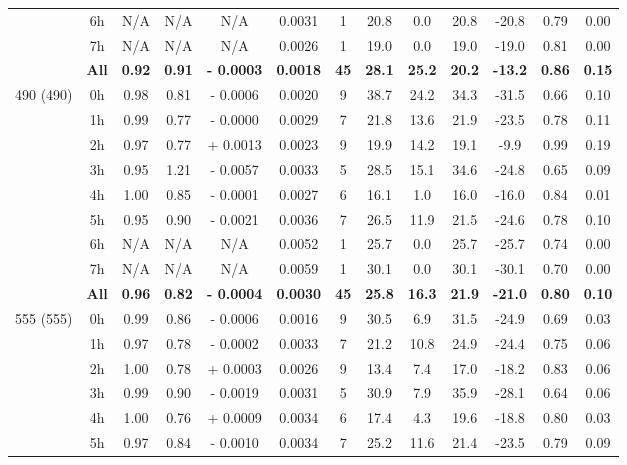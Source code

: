 \documentclass[preview]{standalone}
\begin{document}
\begin{tabular}{ccccccccccccc}
 & 6h  & N/A & N/A & N/A & 0.0031 &  1 & 20.8 & 0.0 & 20.8 & -20.8 & 0.79 & 0.00\\ 
 & 7h  & N/A & N/A & N/A & 0.0026 &  1 & 19.0 & 0.0 & 19.0 & -19.0 & 0.81 & 0.00\\ \cline{2-13}
 & \textbf{All} & \textbf{0.92} & \textbf{0.91} & \textbf{- 0.0003} & \textbf{0.0018} & \textbf{45} & \textbf{28.1} & \textbf{25.2} & \textbf{20.2} & \textbf{-13.2} & \textbf{0.86} & \textbf{0.15} \\ \hline
\multirow{9}{*}{490 (490)} & 0h  & 0.98 & 0.81 & - 0.0006 & 0.0020 &  9 & 38.7 & 24.2 & 34.3 & -31.5 & 0.66 & 0.10 \\ 
 & 1h  & 0.99 & 0.77 & - 0.0000 & 0.0029 &  7 & 21.8 & 13.6 & 21.9 & -23.5 & 0.78 & 0.11 \\ 
 & 2h  & 0.97 & 0.77 & + 0.0013 & 0.0023 &  9 & 19.9 & 14.2 & 19.1 & -9.9 & 0.99 & 0.19 \\ 
 & 3h  & 0.95 & 1.21 & - 0.0057 & 0.0033 &  5 & 28.5 & 15.1 & 34.6 & -24.8 & 0.65 & 0.09 \\ 
 & 4h  & 1.00 & 0.85 & - 0.0001 & 0.0027 &  6 & 16.1 & 1.0 & 16.0 & -16.0 & 0.84 & 0.01 \\ 
 & 5h  & 0.95 & 0.90 & - 0.0021 & 0.0036 &  7 & 26.5 & 11.9 & 21.5 & -24.6 & 0.78 & 0.10 \\ 
 & 6h  & N/A & N/A & N/A & 0.0052 &  1 & 25.7 & 0.0 & 25.7 & -25.7 & 0.74 & 0.00\\ 
 & 7h  & N/A & N/A & N/A & 0.0059 &  1 & 30.1 & 0.0 & 30.1 & -30.1 & 0.70 & 0.00\\ \cline{2-13}
 & \textbf{All} & \textbf{0.96} & \textbf{0.82} & \textbf{- 0.0004} & \textbf{0.0030} & \textbf{45} & \textbf{25.8} & \textbf{16.3} & \textbf{21.9} & \textbf{-21.0} & \textbf{0.80} & \textbf{0.10} \\ \hline
\multirow{9}{*}{555 (555)} & 0h  & 0.99 & 0.86 & - 0.0006 & 0.0016 &  9 & 30.5 & 6.9 & 31.5 & -24.9 & 0.69 & 0.03 \\ 
 & 1h  & 0.97 & 0.78 & - 0.0002 & 0.0033 &  7 & 21.2 & 10.8 & 24.9 & -24.4 & 0.75 & 0.06 \\ 
 & 2h  & 1.00 & 0.78 & + 0.0003 & 0.0026 &  9 & 13.4 & 7.4 & 17.0 & -18.2 & 0.83 & 0.06 \\ 
 & 3h  & 0.99 & 0.90 & - 0.0019 & 0.0031 &  5 & 30.9 & 7.9 & 35.9 & -28.1 & 0.64 & 0.06 \\ 
 & 4h  & 1.00 & 0.76 & + 0.0009 & 0.0034 &  6 & 17.4 & 4.3 & 19.6 & -18.8 & 0.80 & 0.03 \\ 
 & 5h  & 0.97 & 0.84 & - 0.0010 & 0.0034 &  7 & 25.2 & 11.6 & 21.4 & -23.5 & 0.79 & 0.09 \\ 

\end{tabular}
\end{document}
